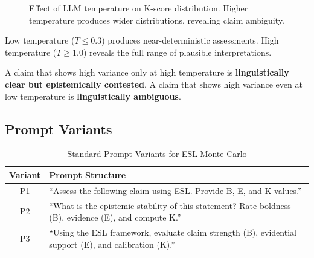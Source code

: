 \documentclass[11pt,a4paper]{article}
\theoremstyle{remark}
\begin{document}
\begin{figure}[h]
\centering
{}
\caption{Effect of LLM temperature on K-score distribution. Higher temperature produces wider distributions, revealing claim ambiguity.}
\label{fig:temperature}
\end{figure}

\begin{keyinsight}[title={Temperature as Ambiguity Probe}]
Low temperature ($T \leq 0.3$) produces near-deterministic assessments. High temperature ($T \geq 1.0$) reveals the full range of plausible interpretations.

A claim that shows high variance only at high temperature is \textbf{linguistically clear but epistemically contested}. A claim that shows high variance even at low temperature is \textbf{linguistically ambiguous}.
\end{keyinsight}

\subsection{Prompt Variants}

\begin{table}[h]
\centering
\caption{Standard Prompt Variants for ESL Monte-Carlo}
\label{tab:prompts}
\begin{tabular}{cp{10cm}}
\toprule
\textbf{Variant} & \textbf{Prompt Structure} \\
\midrule
P1 & ``Assess the following claim using ESL. Provide B, E, and K values.'' \\
P2 & ``What is the epistemic stability of this statement? Rate boldness (B), evidence (E), and compute K.'' \\
P3 & ``Using the ESL framework, evaluate claim strength (B), evidential support (E), and calibration (K).'' \\
\bottomrule
\end{tabular}
\end{table}
\end{document}

